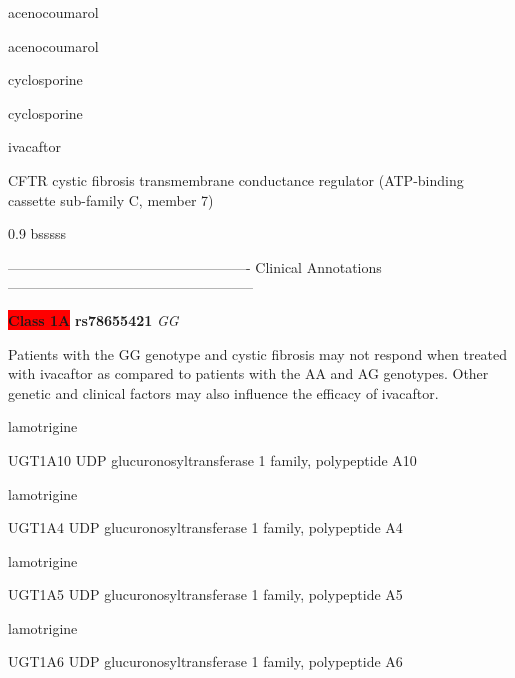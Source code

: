 \documentclass{resume} %
\begin{document}
\begin{rSection}{ acenocoumarol }
\begin{rSection}{ acenocoumarol }
\begin{rSection}{ cyclosporine }
\begin{rSection}{ cyclosporine }
\begin{rSection}{ ivacaftor }
\begin{rSubsection}{ CFTR }{ cystic fibrosis transmembrane conductance regulator (ATP-binding cassette sub-family C, member 7) }{}{}
\begin{center}
\begin{tabularx}{0.9\textwidth}{ bsssss }
\\
		\end{tabularx}
		\end{center}
		\normalsize
		\vspace{10pt}
		        
\item[] ---------------------------------------------------- Clinical Annotations -----------------------------------------------------\newline
\item \textbf{\colorbox{red} {Class 1A}} \textbf{ rs78655421 } \textit{ GG }
\item[] Patients with the GG genotype and cystic fibrosis may not respond when treated with ivacaftor as compared to patients with the AA and AG genotypes. Other genetic and clinical factors may also influence the efficacy of ivacaftor.

\end{rSubsection}

\end{rSection}
\begin{rSection}{ lamotrigine }
\item[]
\begin{rSubsection}{ UGT1A10 }{ UDP glucuronosyltransferase 1 family, polypeptide A10 }{}{}
\item[]


\end{rSubsection}
\begin{rSection}{ lamotrigine }
\item[]
\begin{rSubsection}{ UGT1A4 }{ UDP glucuronosyltransferase 1 family, polypeptide A4 }{}{}
\item[]


\end{rSubsection}
\begin{rSection}{ lamotrigine }
\item[]
\begin{rSubsection}{ UGT1A5 }{ UDP glucuronosyltransferase 1 family, polypeptide A5 }{}{}
\item[]


\end{rSubsection}
\begin{rSection}{ lamotrigine }
\item[]
\begin{rSubsection}{ UGT1A6 }{ UDP glucuronosyltransferase 1 family, polypeptide A6 }{}{}
\item[]



\end{rSubsection}
\end{rSection}
\end{rSection}
\end{rSection}
\end{rSection}
\end{rSection}
\end{rSection}
\end{rSection}
\end{rSection}
\end{document}

